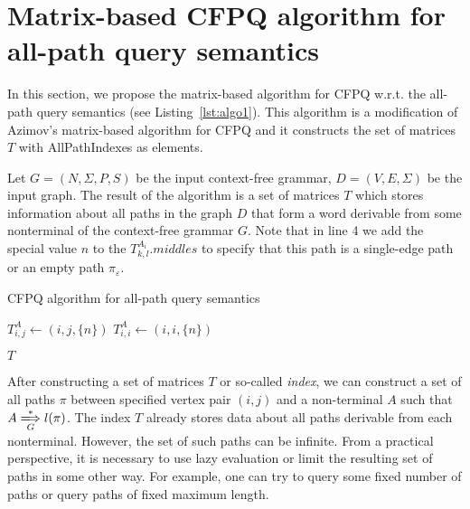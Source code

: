 \section{Matrix-based CFPQ algorithm for all-path query semantics}
\label{sec:all-path-algo}
In this section, we propose the matrix-based algorithm for CFPQ w.r.t. the all-path query semantics (see Listing~\ref{lst:algo1}). This algorithm is a modification of Azimov's matrix-based algorithm for CFPQ and it constructs the set of matrices $T$ with AllPathIndexes as elements.

Let $G = (N, \Sigma, P, S)$ be the input context-free grammar, $D = (V, E, \Sigma)$ be the input graph.
The result of the algorithm is a set of matrices $T$ which stores information about all paths in the graph $D$ that form a word derivable from some nonterminal of the context-free grammar $G$. Note that in line 4 we add the special value $n$ to the $T^{A_i}_{k,l}.middles$ to specify that this path is a single-edge path or an empty path $\pi_{\varepsilon}$.

\begin{algorithm}
\small
\begin{algorithmic}[1]
\caption{CFPQ algorithm for all-path query semantics}
\label{lst:algo1}
 \par
{}
{$T^{A}_{i,j} \gets (i,j,\{n\})$}
\EndFor
{}
{$T^{A}_{i,i} \gets (i,i,\{n\})$}
\EndFor

\EndFor
\EndWhile
\State \Return $T$
\EndFunction

\end{algorithmic}
\end{algorithm}

After constructing a set of matrices $T$ or so-called \textit{index}, we can construct a set of all paths $\pi$ between specified vertex pair $(i, j)$ and a non-terminal $A$ such that $A \xLongrightarrow[G]{*} l(\pi)$. The index $T$ already stores data about all paths derivable from each nonterminal. However, the
set of such paths can be infinite. From a practical perspective, it is necessary
to use lazy evaluation or limit the resulting set of paths in some other way.
For example, one can try to query some fixed number of paths or query paths
of fixed maximum length.

